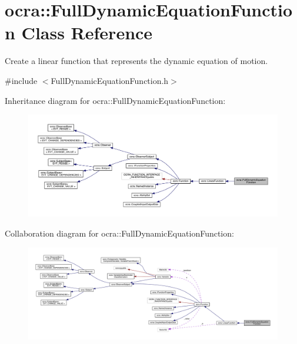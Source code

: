 \hypertarget{classocra_1_1FullDynamicEquationFunction}{}\section{ocra\+:\+:Full\+Dynamic\+Equation\+Function Class Reference}
\label{classocra_1_1FullDynamicEquationFunction}


Create a linear function that represents the dynamic equation of motion.  




{\ttfamily \#include $<$Full\+Dynamic\+Equation\+Function.\+h$>$}



Inheritance diagram for ocra\+:\+:Full\+Dynamic\+Equation\+Function\+:\nopagebreak
\begin{figure}[H]
\begin{center}
\leavevmode
\includegraphics[width=350pt]{da/d36/classocra_1_1FullDynamicEquationFunction__inherit__graph}
\end{center}
\end{figure}


Collaboration diagram for ocra\+:\+:Full\+Dynamic\+Equation\+Function\+:\nopagebreak
\begin{figure}[H]
\begin{center}
\leavevmode
\includegraphics[width=350pt]{d3/d0e/classocra_1_1FullDynamicEquationFunction__coll__graph}
\end{center}
\end{figure}
